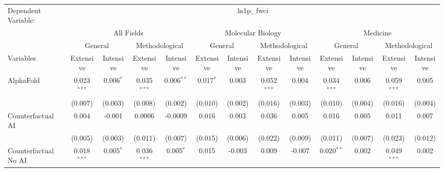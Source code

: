 \begingroup
\centering
\begin{tabular}{lcccccccccccc}
   \tabularnewline \midrule \midrule
   Dependent Variable: & \multicolumn{12}{c}{ln1p\_fwci}\\
 & \multicolumn{4}{c}{All Fields} & \multicolumn{4}{c}{Molecular Biology} & \multicolumn{4}{c}{Medicine} \\
\cmidrule(lr){2-5} \cmidrule(lr){6-9} \cmidrule(lr){10-13}
 & \multicolumn{2}{c}{General} & \multicolumn{2}{c}{Methodological} & \multicolumn{2}{c}{General} & \multicolumn{2}{c}{Methodological} & \multicolumn{2}{c}{General} & \multicolumn{2}{c}{Methodological} \\
\cmidrule(lr){2-3} \cmidrule(lr){4-5} \cmidrule(lr){6-7} \cmidrule(lr){8-9} \cmidrule(lr){10-11} \cmidrule(lr){12-13}
Variables & \multicolumn{1}{c}{Extensive} & \multicolumn{1}{c}{Intensive} & \multicolumn{1}{c}{Extensive} & \multicolumn{1}{c}{Intensive} & \multicolumn{1}{c}{Extensive} & \multicolumn{1}{c}{Intensive} & \multicolumn{1}{c}{Extensive} & \multicolumn{1}{c}{Intensive} & \multicolumn{1}{c}{Extensive} & \multicolumn{1}{c}{Intensive} & \multicolumn{1}{c}{Extensive} & \multicolumn{1}{c}{Intensive} \\
\cmidrule(lr){1-1}\cmidrule(lr){2-2} \cmidrule(lr){3-3} \cmidrule(lr){4-4} \cmidrule(lr){5-5} \cmidrule(lr){6-6} \cmidrule(lr){7-7} \cmidrule(lr){8-8} \cmidrule(lr){9-9} \cmidrule(lr){10-10} \cmidrule(lr){11-11} \cmidrule(lr){12-12} \cmidrule(lr){13-13}
   AlphaFold                                & 0.023$^{***}$ & 0.006$^{*}$    & 0.035$^{***}$ & 0.006$^{**}$   & 0.017$^{*}$ & 0.003           & 0.052$^{***}$ & 0.004    & 0.034$^{***}$ & 0.006           & 0.059$^{***}$ & 0.005\\   
                                            & (0.007)       & (0.003)        & (0.008)       & (0.002)        & (0.010)     & (0.002)         & (0.016)       & (0.003)  & (0.010)       & (0.004)         & (0.016)       & (0.004)\\   
   Counterfactual AI                        & 0.004         & -0.001         & 0.0006        & -0.0009        & 0.016       & 0.003           & 0.036         & 0.005    & 0.016         & 0.005           & 0.011         & 0.007\\   
                                            & (0.005)       & (0.003)        & (0.011)       & (0.007)        & (0.015)     & (0.006)         & (0.022)       & (0.009)  & (0.011)       & (0.007)         & (0.023)       & (0.012)\\   
   Counterfactual No AI                     & 0.018$^{***}$ & 0.005$^{*}$    & 0.036$^{***}$ & 0.005$^{*}$    & 0.015       & -0.003          & 0.009         & -0.007   & 0.020$^{**}$  & 0.002           & 0.049$^{***}$ & 0.002\\   

\end{tabular}
